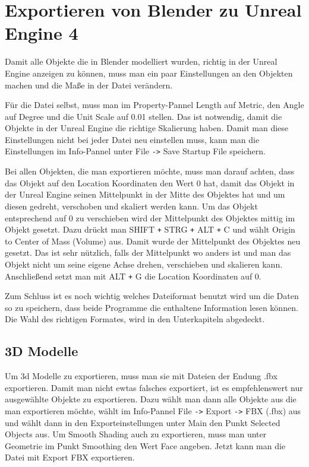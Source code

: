 \section{Exportieren von Blender zu Unreal Engine 4}
\label{sec:Exportieren_von_Blender_zu_Unreal_Engine_4}
Damit alle Objekte die in Blender modelliert wurden, richtig in der Unreal Engine anzeigen zu können, muss man ein paar
Einstellungen an den Objekten machen und die Maße in der Datei verändern.

Für die Datei selbst, muss man im Property-Pannel Length auf Metric, den Angle auf Degree und die Unit Scale auf 0.01 stellen.
Das ist notwendig, damit die Objekte in der Unreal Engine die richtige Skalierung haben. Damit man diese Einstellungen nicht bei
jeder Datei neu einstellen muss, kann man die Einstellungen im Info-Pannel unter File \verb+->+ Save Startup File speichern.

Bei allen Objekten, die man exportieren möchte, muss man darauf achten, dass das Objekt auf den Location Koordinaten
den Wert 0 hat, damit das Objekt in der Unreal Engine seinen Mittelpunkt in der Mitte des Objektes hat und um diesen gedreht, verschoben und skaliert werden kann.
Um das Objekt entsprechend auf 0 zu verschieben wird der Mittelpunkt des Objektes mittig im Objekt gesetzt. Dazu drückt man SHIFT \verb-+- STRG \verb-+- ALT \verb-+- C und
wählt Origin to Center of Mass (Volume) aus. Damit wurde der Mittelpunkt des Objektes neu gesetzt. Das ist sehr nützlich, falls der Mittelpunkt wo anders ist und man das
Objekt nicht um seine eigene Achse drehen, verschieben und skalieren kann. Anschließend setzt man mit ALT \verb-+- G die Location Koordinaten auf 0.


Zum Schluss ist es noch wichtig welches Dateiformat benutzt wird um die Daten so zu speichern, dass beide Programme die enthaltene
Information lesen können. Die Wahl des richtigen Formates, wird in den Unterkapiteln abgedeckt.

\subsection{3D Modelle}
Um 3d Modelle zu exportieren, muss man sie mit Dateien der Endung .fbx exportieren. Damit man nicht ewtas falsches exportiert, ist es empfehlenswert
nur ausgewählte Objekte zu exportieren. Dazu wählt man dann alle Objekte aus die man exportieren möchte, wählt im Info-Pannel File \verb+->+
Export \verb+->+ FBX (.fbx) aus und wählt dann in den Exporteinstellungen unter Main den Punkt Selected Objects aus. Um Smooth Shading auch zu exportieren,
muss man unter Geometrie im Punkt Smoothing den Wert Face angeben. Jetzt kann man die Datei mit Export FBX exportieren.

